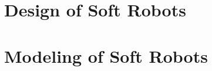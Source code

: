 \documentclass[print,thumbmain]{thesis}  %
\begin{document}
\part{Design of Soft Robots}\label{part: design}

\fi
\ifx\printParts\undefined
\else
\part{Modeling of Soft Robots}\label{part: model}



\fi

%

% 
% 
%
\isstarredchaptertrue           %
%

%
%
%
\end{document}
